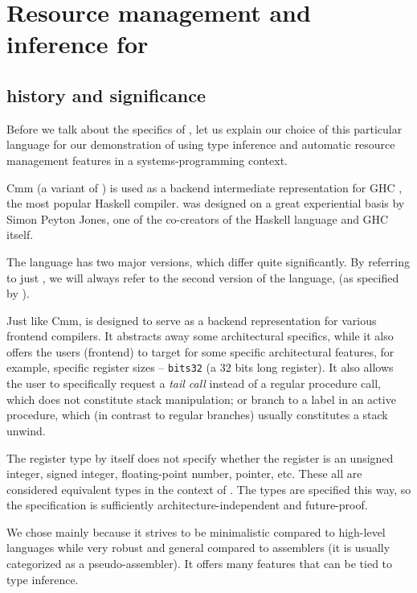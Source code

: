\chapter{Resource management and inference for \cmm}

\label{chap2}

\section{\cmm history and significance}

Before we talk about the specifics of \cmm, let us explain our choice of this particular language for our demonstration of using type inference and automatic resource management features in a systems-programming context.

Cmm (a variant of \cmm) is used as a backend intermediate representation for GHC \cite{haskellbackends}, the most popular Haskell compiler. \cmm was designed on a great experiential basis by Simon Peyton Jones, one of the co-creators of the Haskell language and GHC itself.

The \cmm language has two major versions, which differ quite significantly. By referring to just \cmm, we will always refer to the second version of the language,  (as specified by \citet{ramsey2005c}).

Just like Cmm, \cmm is designed to serve as a backend representation for various frontend compilers. It abstracts away some architectural specifics, while it also offers the users (frontend) to target for some specific architectural features, for example, specific register sizes -- \lstinline{bits32} (a 32 bits long register). It also allows the user to specifically request a \emph{tail call} instead of a regular procedure call, which does not constitute stack manipulation; or  branch to a  label in an active procedure, which (in contrast to regular branches) usually constitutes a stack unwind.


The register type by itself does not specify whether the register is an unsigned integer, signed integer, floating-point number, pointer, etc. These all are considered equivalent types in the context of \cmm. The types are specified this way, so the specification is sufficiently architecture-independent and future-proof.

We chose \cmm mainly because it strives to be minimalistic compared to high-level languages while very robust and general compared to assemblers (it is usually categorized as a pseudo-assembler). It offers many features that can be tied to type inference.


